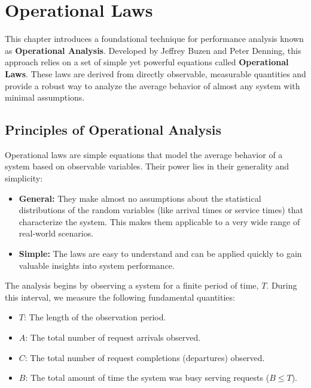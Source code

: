 \chapter{Operational Laws}
\label{chap:operational_laws}

This chapter introduces a foundational technique for performance analysis known as \textbf{Operational Analysis}. Developed by Jeffrey Buzen and Peter Denning, this approach relies on a set of simple yet powerful equations called \textbf{Operational Laws}. These laws are derived from directly observable, measurable quantities and provide a robust way to analyze the average behavior of almost any system with minimal assumptions.

\section{Principles of Operational Analysis}

Operational laws are simple equations that model the average behavior of a system based on observable variables. Their power lies in their generality and simplicity:
\begin{itemize}
    \item \textbf{General:} They make almost no assumptions about the statistical distributions of the random variables (like arrival times or service times) that characterize the system. This makes them applicable to a very wide range of real-world scenarios.
    \item \textbf{Simple:} The laws are easy to understand and can be applied quickly to gain valuable insights into system performance.
\end{itemize}

The analysis begins by observing a system for a finite period of time, $T$. During this interval, we measure the following fundamental quantities:
\begin{itemize}
    \item $T$: The length of the observation period.
    \item $A$: The total number of request arrivals observed.
    \item $C$: The total number of request completions (departures) observed.
    \item $B$: The total amount of time the system was busy serving requests ($B \leq T$).
\end{itemize}

